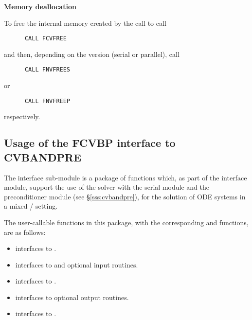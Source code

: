 \begin{Steps}
\item {\bf Memory deallocation}

  To free the internal memory created by the call to  call
\begin{verbatim}
      CALL FCVFREE
\end{verbatim}
  and then, depending on the {\nvector} version (serial or parallel), call
\begin{verbatim}
      CALL FNVFREES
\end{verbatim}
  or
\begin{verbatim}
      CALL FNVFREEP  
\end{verbatim}
  respectively.

\end{Steps}



\subsection{Usage of the FCVBP interface to CVBANDPRE}

The {\fcvbp} interface sub-module is a package of {\C} functions which,
as part of the {\fcvode} interface module, support the use of the
{\cvode} solver with the serial {\nvecs} module and the {\cvbandpre} 
preconditioner module (see \S\ref{sss:cvbandpre}), for the solution of 
ODE systems in a mixed {\F}/{\C} setting.  

The user-callable functions in this package, with the corresponding
{\cvode} and {\cvbandpre} functions, are as follows: 
\begin{itemize}
\item {}
  interfaces to .
\item {}
  interfaces to  and {\spgmr} optional input routines.
\item {}
  interfaces to .
\item {}
  interfaces to {\cvbandpre} optional output routines.
\item {}
  interfaces to .
\end{itemize}

